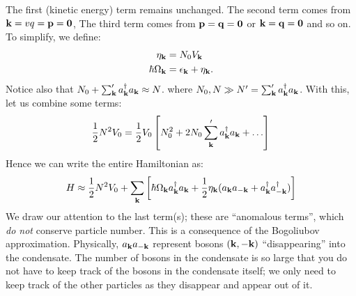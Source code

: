 The first (kinetic energy) term remains unchanged. The second term comes from $\mathbf{k} = v{q} = \mathbf{p} = \mathbf{0}$, The third term comes from $\mathbf{p} = \mathbf{q} = \mathbf{0}$ or $\mathbf{k} = \mathbf{q} = \mathbf{0}$ and so on. To simplify, we define:
\begin{equation}
    \begin{split}
        \eta_{\mathbf{k}} &= N_0V_{\mathbf{k}}
        \\ \hbar \Omega_{\mathbf{k}} &= \epsilon_{\mathbf{k}} + \eta_{\mathbf{k}}.
    \end{split}
\end{equation}
Notice also that $N_0 + \sum_{\mathbf{k}}' a^\dagger_{\mathbf{k}}a_{\mathbf{k}} \approx N$. where $N_0, N \gg N' = \sum_{\mathbf{k}}' a^\dagger_{\mathbf{k}}a_{\mathbf{k}}$. With this, let us combine some terms:
\begin{equation}
    \frac{1}{2}N^2V_0 = \frac{1}{2}V_0\left[N_0^2 + 2N_0\sum_{\mathbf{k}}' a^\dagger_{\mathbf{k}}a_{\mathbf{k}} + \ldots \right]
\end{equation}
Hence we can write the entire Hamiltonian as:
\begin{equation}\label{eq-He4aHamiltonian}
    H \approx \frac{1}{2}N^2 V_0 + \sum_{\mathbf{k}}\left[\hbar \Omega_{\mathbf{k}}a^\dagger_{\mathbf{k}}a_{\mathbf{k}} + \frac{1}{2}\eta_{\mathbf{k}}(a_{\mathbf{k}}a_{-\mathbf{k}} + a^\dagger_{\mathbf{k}}a^\dagger_{-\mathbf{k}})\right]
\end{equation}
We draw our attention to the last term(s); these are ``anomalous terms'', which \emph{do not} conserve particle number. This is a consequence of the Bogoliubov approximation. Physically, $a_{\mathbf{k}}a_{-\mathbf{k}}$ represent bosons $(\mathbf{k}, -\mathbf{k})$ ``disappearing'' into the condensate. The number of bosons in the condensate is so large that you do not have to keep track of the bosons in the condensate itself; we only need to keep track of the other particles as they disappear and appear out of it.

